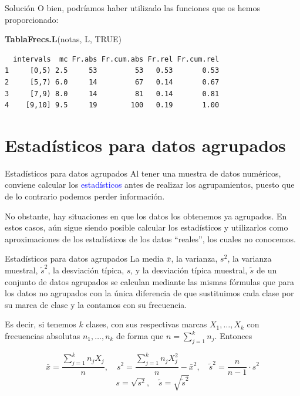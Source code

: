 \documentclass[
  ignorenonframetext,
]{beamer}
\newenvironment{Shaded}{\begin{snugshade}}{\end{snugshade}}
\newcommand{\ConstantTok}[1]{\textcolor[rgb]{0.56,0.35,0.01}{#1}}
\newcommand{\FunctionTok}[1]{\textcolor[rgb]{0.13,0.29,0.53}{\textbf{#1}}}
\newcommand{\NormalTok}[1]{#1}
\newcommand\blue[1]{\textcolor{blue}{#1}}
\begin{document}
\begin{frame}[fragile]{Solución}
\label{soluciuxf3n-29}
O bien, podríamos haber utilizado las funciones que os hemos
proporcionado:

\begin{Shaded}
\begin{Highlighting}[]
\FunctionTok{TablaFrecs.L}\NormalTok{(notas, L, }\ConstantTok{TRUE}\NormalTok{)}
\end{Highlighting}
\end{Shaded}

\begin{verbatim}
  intervals  mc Fr.abs Fr.cum.abs Fr.rel Fr.cum.rel
1     [0,5) 2.5     53         53   0.53       0.53
2     [5,7) 6.0     14         67   0.14       0.67
3     [7,9) 8.0     14         81   0.14       0.81
4    [9,10] 9.5     19        100   0.19       1.00
\end{verbatim}
\end{frame}

\section{Estadísticos para datos
agrupados}\label{estaduxedsticos-para-datos-agrupados}

\begin{frame}{Estadísticos para datos agrupados}
\label{estaduxedsticos-para-datos-agrupados-1}
Al tener una muestra de datos numéricos, conviene calcular los
\blue{ estadísticos } antes de realizar los agrupamientos, puesto que de
lo contrario podemos perder información.

No obstante, hay situaciones en que los datos los obtenemos ya
agrupados. En estos casos, aún sigue siendo posible calcular los
estadísticos y utilizarlos como aproximaciones de los estadísticos de
los datos ``reales'', los cuales no conocemos.
\end{frame}

\begin{frame}{Estadísticos para datos agrupados}
\label{estaduxedsticos-para-datos-agrupados-2}
La media \(\bar{x}\), la varianza, \(s^2\), la varianza muestral,
\(\tilde{s}^2\), la desviación típica, \(s\), y la desviación típica
muestral, \(\tilde{s}\) de un conjunto de datos agrupados se calculan
mediante las mismas fórmulas que para los datos no agrupados con la
única diferencia de que sustituimos cada clase por su marca de clase y
la contamos con su frecuencia.

Es decir, si tenemos \(k\) clases, con sus respectivas marcas
\(X_1,\dots,X_k\) con frecuencias absolutas \(n_1,\dots,n_k\) de forma
que \(n=\sum_{j=1}^kn_j\). Entonces

\[\bar{x}=\frac{\sum_{j=1}^kn_jX_j}{n},\quad s^2=\frac{\sum_{j=1}^kn_jX_j^2}{n}-\bar{x}^2,\quad \tilde{s}^2=\frac{n}{n-1}\cdot s^2\]
\[s=\sqrt{s^2},\quad \tilde{s}=\sqrt{\tilde{s}^2}\]
\end{frame}
\end{document}
